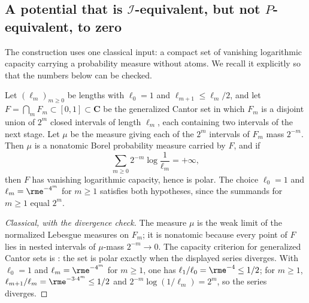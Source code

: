 \subsection{A potential that is
\texorpdfstring{\(\mathcal I\)}{I}-equivalent, but not
\texorpdfstring{\(P\)}{P}-equivalent, to zero}
\label{sec:ch51-cantor}

The construction uses one classical input: a compact set of vanishing
logarithmic capacity carrying a probability measure without atoms.  We
recall it explicitly so that the numbers below can be checked.

\begin{lemma}\label{lem:ch51-polar-cantor}
Let \((\ell_m)_{m\geq0}\) be lengths with \(\ell_0=1\) and
\(\ell_{m+1}\leq\ell_m/2\), and let
\(F=\bigcap_mF_m\subset[0,1]\subset\mathbf C\) be the generalized Cantor
set in which \(F_m\) is a disjoint union of \(2^m\) closed intervals of
length \(\ell_m\), each containing two intervals of the next stage.  Let
\(\mu\) be the measure giving each of the \(2^m\) intervals of \(F_m\)
mass \(2^{-m}\).  Then \(\mu\) is a nonatomic Borel probability measure
carried by \(F\), and if
\[
 \sum_{m\geq0}2^{-m}\log\frac{1}{\ell_m}=+\infty ,
\]
then \(F\) has vanishing logarithmic capacity, hence is polar.  The
choice \(\ell_0=1\) and \(\ell_m=\rme^{-4^m}\) for \(m\geq1\)
satisfies both hypotheses, since the summands for \(m\geq1\) equal \(2^m\).
\end{lemma}

\begin{proof}[Classical, with the divergence check]
The measure \(\mu\) is the weak limit of the normalized Lebesgue measures
on \(F_m\); it is nonatomic because every point of \(F\) lies in nested
intervals of \(\mu\)-mass \(2^{-m}\to0\).  The capacity criterion for
generalized Cantor sets is \cite[p.~31]{Car83}: the set is polar exactly
when the displayed series diverges.  With \(\ell_0=1\) and
\(\ell_m=\rme^{-4^m}\) for \(m\geq1\), one has
\(\ell_1/\ell_0=\rme^{-4}\leq1/2\); for \(m\geq1\),
\(\ell_{m+1}/\ell_m=\rme^{-3\cdot4^m}\leq1/2\) and
\(2^{-m}\log(1/\ell_m)=2^m\), so the series diverges.
\end{proof}

